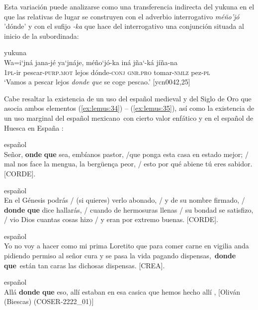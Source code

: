 \documentclass[output=paper]{langscibook}
\begin{document}
Esta variación puede analizarse como una transferencia indirecta del yukuna en el que las relativas de lugar se construyen con el adverbio interrogativo \textit{méño’jó} 'dónde' y con el sufijo \textit{-ka} que hace del interrogativo una conjunción situada al inicio de la subordinada:

\ea\label{ex:lemus:33}
{yukuna}\\
\gll Wa=i‘jná jana-jé ya‘jnáje, méño‘jó-ka iná  jña‘-ká  jíña-na\\
     1\textsc{pl}-ir pescar\textsc{-purp.mot} lejos dónde-\textsc{conj} \textsc{gnr.pro} tomar-\textsc{nmlz} pez-\textsc{pl}\\
\glt `Vamos a pescar lejos \textit{donde que} se coge pescao.' [ycn0042,25]
\z

Cabe resaltar la existencia de un uso del español medieval y del Siglo de Oro que asocia ambos elementos 
(\ref{ex:lemus:34}) -- (\ref{ex:lemus:35}), así como la existencia de un uso marginal del español mexicano~con cierto valor enfático    y en el español de Huesca en España  :

\ea\label{ex:lemus:34}
{español}\\
Señor, \textbf{onde} \textbf{que} sea, embíanos pastor,  /que ponga esta casa en estado mejor;  / mal nos face la mengua, la bergüença peor, / esto por qué abiene tú eres sabidor.  {\citep{RAE2020}} {[CORDE].}\\
\z

\ea\label{ex:lemus:35}
{español}\\
En el Génesis podrás  / (si quieres) verlo abonado,  / y de su nombre firmado,  / \textbf{donde} \textbf{que} dice hallarás, / cuando de hermosuras llenas / su bondad se satisfizo, / vio Dios cuantas cosas hizo / y eran por extremo buenas. {\citep{RAE2020}} {[CORDE].}\\
\z

\ea\label{ex:lemus:36prim}
{español}\\
Yo no voy a hacer como mi prima Loretito que para comer carne en vigilia anda pidiendo permiso al señor cura y se pasa la vida pagando dispensas,{~}\textbf{donde} \textbf{que}{~}están tan caras las dichosas dispensas. {\citep{RAE2020}} {[CREA].}\\
\z

\ea\label{ex:lemus:37prim}
{español}\\
Allá \textbf{donde} \textbf{que} eso, allí estaban en esa casica que hemos hecho allí {\citep{Fernández-Ordóñez2005}}, {[Oliván (Biescas) (COSER-2222\_01)]}  \\
\z
\end{document}
